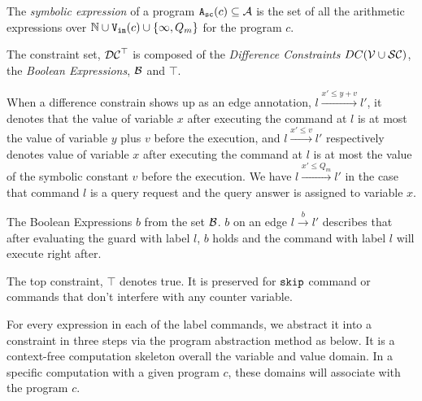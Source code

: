 \begin{defn}
 \label{def:adaptfun-symbolic_expr}
 The \emph{symbolic expression} of a program ${\mathtt{A_{sc}}}(c) \subseteq \mathcal{A}$ is the set of all the arithmetic expressions over $\mathbb{N} \cup {\ensuremath{\mathtt{V_{\mathtt{in}}}}}(c) \cup \{\infty, Q_m \}$ for the program $c$.
\end{defn}

\begin{defn}[Constraint]
 The constraint set, $\mathcal{DC}^{\top}$ is composed of the \emph{Difference Constraints} $DC(\mathcal{V} \cup \mathcal{SC})$, the \emph{Boolean Expressions}, $\mathcal{B}$ and $\top$.
 \end{defn}
 

When a difference constrain shows up as an edge annotation, $l \xrightarrow{x' \leq y + v} l'$,
it denotes that
the value of variable $x$
after executing the command at $l$ is at most
the value of variable $y$ plus $v$ before the execution,
and $l \xrightarrow{x' \leq v} l'$ respectively denotes value of variable $x$
after executing the command at $l$ is at most
the value of the symbolic constant $v$ before the execution.
We have $l \xrightarrow{x' \leq Q_m} l'$ in the case that command $l$ is a query request and the query answer is assigned to variable $x$.

%

The Boolean Expressions $b$ from the set $\mathcal{B}$.
$b$ on an edge $l \xrightarrow{b} l'$ describes
that after evaluating the guard with label $l$,
$b$ holds and the command with label $l$ will execute right after.
%

The top constraint, $\top$ denotes true. It is preserved for $\mathtt{skip}$ command or commands that don't
interfere with any counter variable.


For every expression in each of the label commands, we abstract it into a constraint in three steps via the program abstraction method as below.
It is a context-free computation skeleton overall the variable and value domain. In a specific computation with a given program $c$, these domains will associate with the program $c$.

